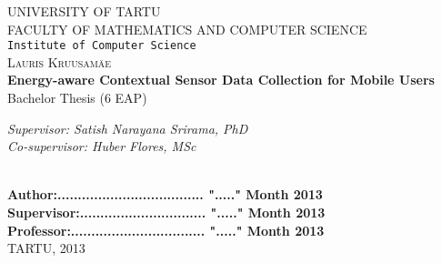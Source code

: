 \begin{titlepage}

\begin{center}



\textsc{UNIVERSITY OF TARTU}\\

\textsc{FACULTY OF MATHEMATICS AND COMPUTER SCIENCE}\\

\texttt{Institute of Computer Science}\\[5cm]

\textsc{ \large Lauris Kruusamäe}\\[0.5cm]
{\Huge \bfseries Energy-aware Contextual Sensor Data Collection for Mobile Users}\\[0.5cm]
{\large Bachelor Thesis (6 EAP)}\\[3cm]



\begin{minipage}{0.8\textwidth}
\begin{flushright} \large
\emph{Supervisor: Satish Narayana Srirama, PhD}  \\	  %
\emph{Co-supervisor: Huber Flores, MSc}  %
\end{flushright}
\end{minipage}

\textbf{}\\[1.0cm]

\textbf{Author:.................................... "....." Month   2013}\\[0.5cm]

\textbf{Supervisor:............................... "....." Month   2013}\\[0.5cm]

\textbf{Professor:................................. "....." Month   2013}\\[0.5cm]        

\vfill
{\large TARTU, 2013}

\end{center}

\end{titlepage}
